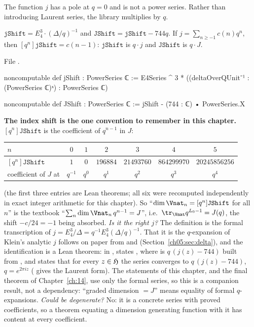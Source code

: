 The function $j$ has a pole at $q = 0$ and is not a power series. Rather than introducing Laurent
series, the library multiplies by $q$.

\begin{definition}[$qj$ and $qJ$]\label{ch05:def:jshift}
$\mathtt{jShift} = E_4^3\cdot(\Delta/q)^{-1}$ and $\mathtt{JShift} = \mathtt{jShift} - 744q$. If $j =
\sum_{n\ge-1}c(n)q^n$, then $[q^n]\mathtt{jShift} = c(n-1)$: $\mathtt{jShift}$ is $q\cdot j$ and
$\mathtt{JShift}$ is $q\cdot J$.
\end{definition}
\noindent File .
\begin{leancode}
noncomputable def jShift : PowerSeries ℂ :=
  E4Series ^ 3 * ((deltaOverQUnit⁻¹ : (PowerSeries ℂ)ˣ) : PowerSeries ℂ)

noncomputable def JShift : PowerSeries ℂ := jShift - (744 : ℂ) • PowerSeries.X
\end{leancode}
\begin{dictionary}
\textbf{The index shift is the one convention to remember in this chapter.} $[q^n]\mathtt{JShift}$ is
the coefficient of $q^{n-1}$ in $J$:
\begin{center}
\begin{tabular}{lcccccc}
\toprule
$n$ & $0$ & $1$ & $2$ & $3$ & $4$ & $5$\\
\midrule
$[q^n]\mathtt{JShift}$ & $1$ & $0$ & $196884$ & $21493760$ & $864299970$ & $20245856256$\\
coefficient of $J$ at & $q^{-1}$ & $q^0$ & $q^1$ & $q^2$ & $q^3$ & $q^4$\\
\bottomrule
\end{tabular}
\end{center}
(the first three entries are Lean theorems; all six were recomputed independently in exact integer
arithmetic for this chapter). So ``$\dim\Vnat_n = [q^n]\mathtt{JShift}$ for all $n$'' is the textbook
``$\sum_n\dim\Vnat_n\,q^{n-1} = J$'', i.e.\ $\tr_{\Vnat}q^{L_0 - 1} = J(q)$, the shift $-c/24 = -1$
being absorbed. \emph{Is it the right $j$?} The definition is the formal transcription of $j =
E_4^3/\Delta = q^{-1}E_4^3(\Delta/q)^{-1}$. That it is the $q$-expansion of Klein's analytic $j$ follows
on paper from  and  (Section~\ref{ch05:sec:delta}), and
the identification is a Lean theorem: in ,
 states , where  is $q\,(j(z)-744)$ built from
, and  states that for every $z\in\mathfrak{H}$ the series 
converges to $q\,(j(z)-744)$, $q=e^{2\pi iz}$ ( gives the Laurent form). The statements of
this chapter, and the final theorem of Chapter~\ref{ch:14}, use only the formal series, so this is a companion
result, not a dependency: ``graded dimension $=J$'' means
equality of formal $q$-expansions.
\emph{Could  be degenerate?} No: it is a concrete series with proved coefficients, so a
theorem equating a dimension generating function with it has content at every coefficient.
\end{dictionary}

